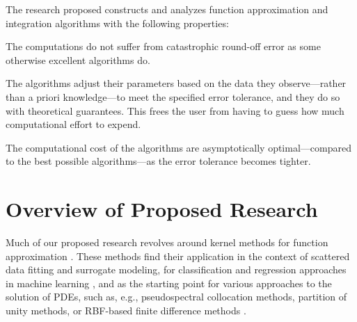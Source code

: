 \documentclass[11pt]{NSFamsart}
\begin{document}
The research proposed constructs and analyzes function approximation and integration algorithms with the following properties:
\begin{description}[leftmargin=2.5ex]
\item[Stability] The computations do not suffer from catastrophic round-off error as some otherwise excellent algorithms do.

\item[Adaptivity] The algorithms adjust their parameters based on the data they observe---rather than a priori knowledge---to meet the specified error tolerance, and they do so with theoretical guarantees.  This frees the user from having to guess how much computational effort to expend.

\item[Efficiency] The computational cost of the algorithms are asymptotically optimal---compared to the best possible algorithms---as the error tolerance becomes tighter.
\end{description}

\section{Overview of Proposed Research}
Much of our proposed research revolves around kernel methods for function approximation \citep{Fas07a,SchWen06a,Wen05a}. These methods find their application in the context of scattered data fitting and surrogate modeling, for classification and regression approaches in machine learning \citep{HasTibFrie01}, and as the starting point for various approaches to the solution of PDEs, such as, e.g., pseudospectral collocation methods, partition of unity methods, or RBF-based finite difference methods \citep{Fas07a,FornbergFlyer15}.
\end{document}
